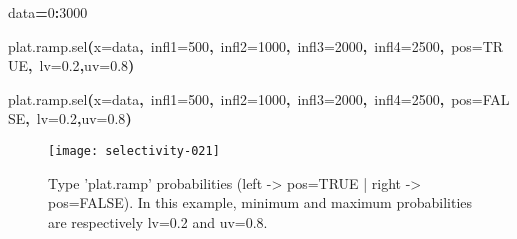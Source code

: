 \documentclass[letterpaper, 12pt]{article}
\newenvironment{Hinput}%
{}%
{}%
\newenvironment{Hchunk}%
{\vspace{0.5em}\par\begin{flushleft}}%
{\end{flushleft}}%
\newcommand{\hlnumber}[1]{\textcolor[rgb]{0.0823529411764706,0.0784313725490196,0.709803921568627}{#1}}%
\newcommand{\hlfunctioncall}[1]{\textcolor[rgb]{1,0,0}{#1}}%
\newcommand{\hlkeyword}[1]{\textcolor[rgb]{0,0,0}{\textbf{#1}}}%
\newcommand{\hlargument}[1]{\textcolor[rgb]{0.694117647058824,0.247058823529412,0.0196078431372549}{#1}}%
\newcommand{\hlassignement}[1]{\textcolor[rgb]{0.215686274509804,0.215686274509804,0.384313725490196}{\textbf{#1}}}%
\newcommand{\hlsymbol}[1]{\textcolor[rgb]{0,0,0}{#1}}%
\newcommand{\hlprompt}[1]{\textcolor[rgb]{0,0,0}{#1}}%
\begin{document}
\begin{Hchunk}
\begin{normalsize}
\begin{Hinput}
\ttfamily\noindent
\hlprompt{\usebox{\hlnormalsizeboxgreaterthan}{\ }}\hlsymbol{data}\hlassignement{=}\hlnumber{0}\hlkeyword{:}\hlnumber{3000}\mbox{}
\normalfont
\end{Hinput}


\begin{Hinput}
\ttfamily\noindent
\hlprompt{\usebox{\hlnormalsizeboxgreaterthan}{\ }}\hlfunctioncall{plat.ramp.sel}\hlkeyword{(}\hlargument{x}\hlargument{=}\hlsymbol{data}\hlkeyword{,}{\ }\hlargument{infl1}\hlargument{=}\hlnumber{500}\hlkeyword{,}{\ }\hlargument{infl2}\hlargument{=}\hlnumber{1000}\hlkeyword{,}{\ }\hlargument{infl3}\hlargument{=}\hlnumber{2000}\hlkeyword{,}{\ }\hlargument{infl4}\hlargument{=}\hlnumber{2500}\hlkeyword{,}{\ }\hlargument{pos}\hlargument{=}\hlnumber{TRUE}\hlkeyword{,}{\ }\hlargument{lv}\hlargument{=}\hlnumber{0.2}\hlkeyword{,}\hlargument{uv}\hlargument{=}\hlnumber{0.8}\hlkeyword{)}\mbox{}
\normalfont
\end{Hinput}


\begin{Hinput}
\ttfamily\noindent
\hlprompt{\usebox{\hlnormalsizeboxgreaterthan}{\ }}\hlfunctioncall{plat.ramp.sel}\hlkeyword{(}\hlargument{x}\hlargument{=}\hlsymbol{data}\hlkeyword{,}{\ }\hlargument{infl1}\hlargument{=}\hlnumber{500}\hlkeyword{,}{\ }\hlargument{infl2}\hlargument{=}\hlnumber{1000}\hlkeyword{,}{\ }\hlargument{infl3}\hlargument{=}\hlnumber{2000}\hlkeyword{,}{\ }\hlargument{infl4}\hlargument{=}\hlnumber{2500}\hlkeyword{,}{\ }\hlargument{pos}\hlargument{=}\hlnumber{FALSE}\hlkeyword{,}{\ }\hlargument{lv}\hlargument{=}\hlnumber{0.2}\hlkeyword{,}\hlargument{uv}\hlargument{=}\hlnumber{0.8}\hlkeyword{)}\mbox{}
\normalfont
\end{Hinput}


\end{normalsize}
\end{Hchunk}

\begin{figure}[h]
\vspace{-20pt}
\begin{center}
\texttt{[image: selectivity-021]}
\end{center}
\vspace{-30pt}
\caption{Type 'plat.ramp' probabilities (left -> pos=TRUE |  right -> pos=FALSE). In this example, minimum and maximum probabilities are respectively lv=0.2 and uv=0.8.}
\vspace{-20pt}
\label{fig10}
\end{figure}
\end{document}
